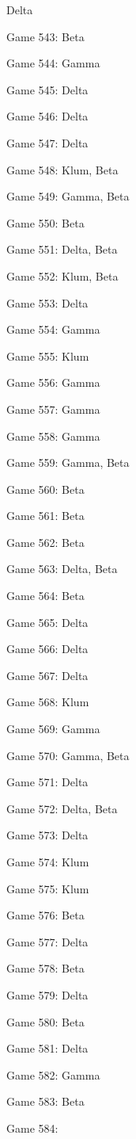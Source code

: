 \documentclass{article}
\begin{document}
\begin{multicols}{3}
\begin{compactitem}
Delta
\item Game 543:
Beta
\item Game 544:
Gamma
\item Game 545:
Delta
\item Game 546:
Delta
\item Game 547:
Delta
\item Game 548:
Klum, Beta
\item Game 549:
Gamma, Beta
\item Game 550:
Beta
\item Game 551:
Delta, Beta
\item Game 552:
Klum, Beta
\item Game 553:
Delta
\item Game 554:
Gamma
\item Game 555:
Klum
\item Game 556:
Gamma
\item Game 557:
Gamma
\item Game 558:
Gamma
\item Game 559:
Gamma, Beta
\item Game 560:
Beta
\item Game 561:
Beta
\item Game 562:
Beta
\item Game 563:
Delta, Beta
\item Game 564:
Beta
\item Game 565:
Delta
\item Game 566:
Delta
\item Game 567:
Delta
\item Game 568:
Klum
\item Game 569:
Gamma
\item Game 570:
Gamma, Beta
\item Game 571:
Delta
\item Game 572:
Delta, Beta
\item Game 573:
Delta
\item Game 574:
Klum
\item Game 575:
Klum
\item Game 576:
Beta
\item Game 577:
Delta
\item Game 578:
Beta
\item Game 579:
Delta
\item Game 580:
Beta
\item Game 581:
Delta
\item Game 582:
Gamma
\item Game 583:
Beta
\item Game 584:

\end{compactitem}
\end{multicols}
\end{document}
